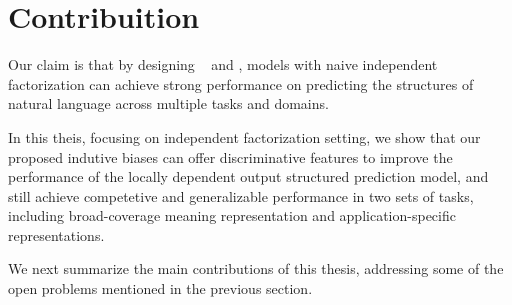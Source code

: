 \section{Contribuition}
\label{sec:intro-contri}

 Our claim is that by designing
~ and , models with naive independent factorization can achieve
strong performance on predicting the structures of natural language
across multiple tasks and domains.

 In this theis, focusing on independent factorization setting, we show
that our proposed indutive biases can offer discriminative features to
improve the performance of the locally dependent output structured
prediction model, and still achieve competetive and generalizable
performance in two sets of tasks, including broad-coverage meaning
representation and application-specific representations.

We next summarize the main contributions of this thesis, addressing
some of the open problems mentioned in the previous section.

